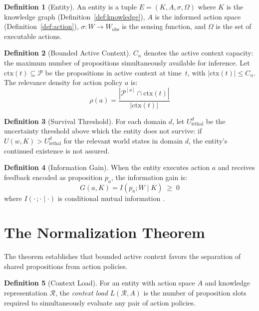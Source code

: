 \documentclass[11pt]{article}
\theoremstyle{definition}
\newtheorem{definition}{Definition}
\theoremstyle{remark}
\begin{document}
\begin{definition}[Entity]
\label{def:entity}
An entity is a tuple $E = (K, A, \sigma, \Omega)$ where $K$ is the knowledge
graph (Definition~\ref{def:knowledge}), $A$ is the informed action space
(Definition~\ref{def:action}), $\sigma : W \to W_{\text{obs}}$ is the
sensing function, and $\Omega$ is the set of executable actions.
\end{definition}

\begin{definition}[Bounded Active Context]
\label{def:context}
$C_n$ denotes the active context capacity: the maximum number of
propositions simultaneously available for inference. Let
$\mathrm{ctx}(t) \subseteq \mathcal{P}$ be the propositions in active
context at time~$t$, with $|\mathrm{ctx}(t)| \leq C_n$. The relevance
density for action policy $a$ is:
\[
\rho(a) = \frac{|\mathcal{P}^{[a]} \cap \mathrm{ctx}(t)|}{|\mathrm{ctx}(t)|}
\]
\end{definition}

\begin{definition}[Survival Threshold]
\label{def:survival}
For each domain $d$, let $U_{\text{lethal}}^d$ be the uncertainty
threshold above which the entity does not survive: if $U(w, K) >
U_{\text{lethal}}^d$ for the relevant world states in domain $d$, the
entity's continued existence is not assured.
\end{definition}

\begin{definition}[Information Gain]
\label{def:infogain}
When the entity executes action $a$ and receives feedback encoded as
proposition $p_a$, the information gain is:
\[
G(a, K) = I(p_a ; W \mid K) \;\geq\; 0
\]
where $I(\cdot\,;\cdot \mid \cdot)$ is conditional mutual information
\cite{Cover2006}.
\end{definition}

\section{The Normalization Theorem}
\label{sec:theorem}

The theorem establishes that bounded active context favors the
separation of shared propositions from action policies.

\begin{definition}[Context Load]
\label{def:load}
For an entity with action space $A$ and knowledge representation $\mathcal{R}$,
the \emph{context load} $L(\mathcal{R}, A)$ is the number of proposition
slots required to simultaneously evaluate any pair of action policies.
\end{definition}
\end{document}
